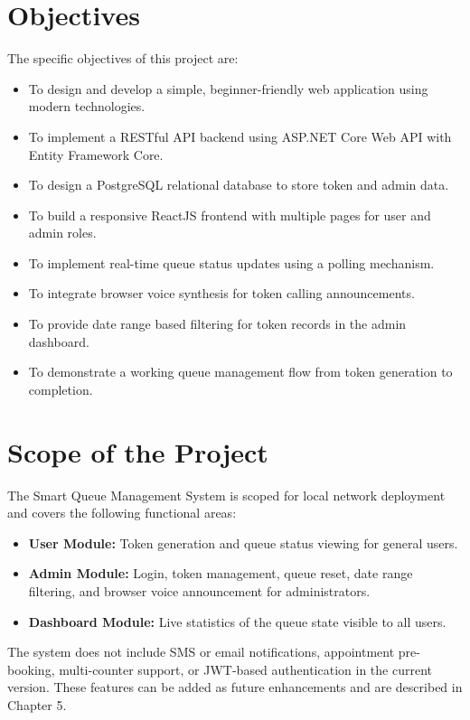\section{Objectives}

The specific objectives of this project are:

\begin{itemize}
    \item To design and develop a simple, beginner-friendly web application using modern technologies.
    \item To implement a RESTful API backend using ASP.NET Core Web API with Entity Framework Core.
    \item To design a PostgreSQL relational database to store token and admin data.
    \item To build a responsive ReactJS frontend with multiple pages for user and admin roles.
    \item To implement real-time queue status updates using a polling mechanism.
    \item To integrate browser voice synthesis for token calling announcements.
    \item To provide date range based filtering for token records in the admin dashboard.
    \item To demonstrate a working queue management flow from token generation to completion.
\end{itemize}

\section{Scope of the Project}

The Smart Queue Management System is scoped for local network deployment and covers the following functional areas:

\begin{itemize}
    \item \textbf{User Module:} Token generation and queue status viewing for general users.
    \item \textbf{Admin Module:} Login, token management, queue reset, date range filtering, and browser voice announcement for administrators.
    \item \textbf{Dashboard Module:} Live statistics of the queue state visible to all users.
\end{itemize}

The system does not include SMS or email notifications, appointment pre-booking, multi-counter support, or JWT-based authentication in the current version. These features can be added as future enhancements and are described in Chapter 5.

